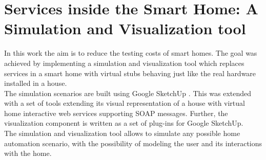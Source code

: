 \section{Services inside the Smart Home: A Simulation and Visualization tool}\label{sec:services_in_smart_homes}

In this work \cite{lazovik2009services} the aim is to reduce the testing costs of smart homes. The goal was achieved by implementing a simulation and visualization tool which replaces services in a smart home with virtual stubs behaving just like the real hardware installed in a house.\\

The simulation scenarios are built using Google SketchUp \cite{sketchup:online}. This was extended with a set of tools extending its visual representation of a house with virtual home interactive web services supporting SOAP messages. Further, the visualization component is written as a set of plug-ins for Google SketchUp.\\

The simulation and visualization tool allows to simulate any possible home automation scenario, with the possibility of modeling the user and its interactions with the home.
